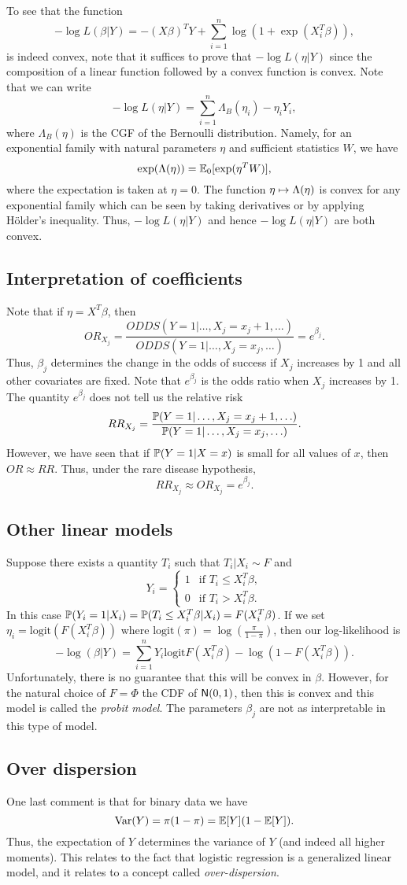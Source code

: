 To see that the function 
\[-\log L(\beta|Y)  = -(X\beta)^TY +\sum_{i=1}^n \log(1+\exp(X_i^T\beta)),\]
is indeed convex, note that it suffices to prove that $-\log L(\eta |Y)$ since the composition of a linear function followed by a convex function is convex. Note that we can write
\[-\log L(\eta|Y) = \sum_{i=1}^n \Lambda_B(\eta_i)-\eta_i Y_i, \]
where $\Lambda_B(\eta)$ is the CGF of the Bernoulli distribution. Namely, for an exponential family with natural parameters $\eta$ and sufficient statistics $W$, we have
\[\exp(\Lambda(\eta)) = {\mathbb{E}}_0[\exp(\eta^T W)], \]
where the expectation is taken at $\eta = 0$. The function $\eta \mapsto \Lambda(\eta)$ is convex for any exponential family which can be seen by taking derivatives or by applying H\"older's inequality. Thus, $-\log L(\eta|Y)$ and hence $-\log L(\eta|Y)$ are both convex.
\subsection{Interpretation of coefficients}
Note that if $\eta = X^T \beta$, then 
\[OR_{X_j} = \frac{ODDS(Y=1|\ldots, X_j = x_j+1,\ldots)}{ODDS(Y=1|\ldots, X_j = x_j,\ldots)} = e^{\beta_j}. \]
Thus, $\beta_j$ determines the change in the odds of success if $X_j$ increases by 1 and all other covariates are fixed. Note that $e^{\beta_j}$ is the odds ratio when $X_j$ increases by 1. The quantity $e^{\beta_j}$ does not tell us the relative risk 
\[RR_{X_j} =\frac{{\mathbb{P}}(Y=1|\ldots, X_j = x_j+1,\ldots)}{{\mathbb{P}}(Y=1|\ldots, X_j = x_j,\ldots)}. \]
However, we have seen that if ${\mathbb{P}}(Y=1|X=x)$ is small for all values of $x$, then $OR \approx RR$. Thus, under the rare disease hypothesis,
\[RR_{X_j} \approx OR_{X_j} = e^{\beta_j}.\]
\subsection{Other linear models}
Suppose there exists a quantity $T_i$ such that $T_i | X_i \sim F$ and 
\[Y_i = \begin{cases}
    1 & \text{if } T_i \le X_i^T \beta,\\
    0 & \text{if } T_i > X_i^T\beta.
\end{cases} \]
In this case ${\mathbb{P}}(Y_i = 1|X_i) = {\mathbb{P}}(T_i \le X_i^T\beta |X_i) = F(X_i^T\beta)$. If we set $\eta_i = \text{logit}(F(X_i^T\beta))$ where $\text{logit}(\pi) =\log\left(\frac{\pi}{1-\pi}\right)$, then our log-likelihood is 
\[-\log(\beta|Y) = \sum_{i=1}^n Y_i \text{logit}F(X_i^T\beta)-\log(1-F(X_i^T\beta)).\]
Unfortunately, there is no guarantee that this will be convex in $\beta$. However, for the natural choice of $F = \Phi$ the CDF of $\mathsf{N}(0,1)$, then this is convex and this model is called the \emph{probit model}. The parameters $\beta_j$ are not as interpretable in this type of model.
\subsection{Over dispersion}
One last comment is that for binary data we have
\[\operatorname{Var}(Y) = \pi(1-\pi) = {\mathbb{E}}[Y](1-{\mathbb{E}}[Y]). \]
Thus, the expectation of $Y$ determines the variance of $Y$ (and indeed all higher moments).  This relates to the fact that logistic regression is a generalized linear model, and it relates to a concept called \emph{over-dispersion}.
